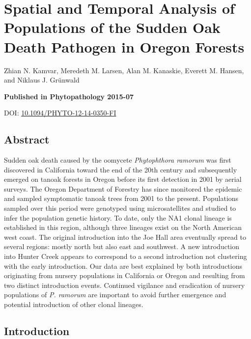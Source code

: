 \documentclass[double,12pt]{beavtex}
\begin{document}
  \chapter{Spatial and Temporal Analysis of Populations of the Sudden Oak
  Death Pathogen in Oregon
  Forests}\label{spatial-and-temporal-analysis-of-populations-of-the-sudden-oak-death-pathogen-in-oregon-forests}
  
  Zhian N. Kamvar, Meredeth M. Larsen, Alan M. Kanaskie, Everett M.
  Hansen, and Niklaus J. Grünwald
  
  \vspace*{\fill}
  
  \textbf{Published in Phytopathology 2015-07}
  
  DOI:
  \href{http://dx.doi.org/10.1094/PHYTO-12-14-0350-FI}{10.1094/PHYTO-12-14-0350-FI}
  
  \newpage
  
  \section{Abstract}\label{abstract-1}
  
  Sudden oak death caused by the oomycete \emph{Phytophthora ramorum} was
  first discovered in California toward the end of the 20th century and
  subsequently emerged on tanoak forests in Oregon before its first
  detection in 2001 by aerial surveys. The Oregon Department of Forestry
  has since monitored the epidemic and sampled symptomatic tanoak trees
  from 2001 to the present. Populations sampled over this period were
  genotyped using microsatellites and studied to infer the population
  genetic history. To date, only the NA1 clonal lineage is established in
  this region, although three lineages exist on the North American west
  coast. The original introduction into the Joe Hall area eventually
  spread to several regions: mostly north but also east and southwest. A
  new introduction into Hunter Creek appears to correspond to a second
  introduction not clustering with the early introduction. Our data are
  best explained by both introductions originating from nursery
  populations in California or Oregon and resulting from two distinct
  introduction events. Continued vigilance and eradication of nursery
  populations of \emph{P. ramorum} are important to avoid further
  emergence and potential introduction of other clonal lineages.
  
  \section{Introduction}\label{introduction-1}
  
\end{document}
